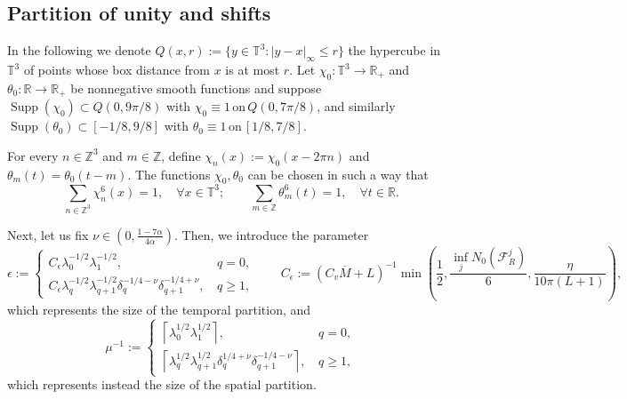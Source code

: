 \documentclass[10pt,a4paper]{amsart}
\numberwithin{equation}{section}
\numberwithin{corollario}{section}
\numberwithin{lemma}{section}
\numberwithin{prop}{section}
\theoremstyle{definition}
\theoremstyle{remark}
\newcommand{\Z}{\mathbb{Z}}
\newcommand{\R}{\mathbb{R}}
\newcommand{\T}{\mathbb{T}}
\newcommand{\F}{\mathcal{F}}
\DeclareMathOperator{\supp}{Supp}
\newcommand{\qq}{_{q+1}}
\newcommand{\oM}{\overline{M}}
\begin{document}
\subsection{Partition of unity and shifts}
In the following we denote $Q(x,r) := \{ y \in \T^3 : |y-x|_{\infty} \leq r \}$ the hypercube in $\T^3$ of points whose box distance from $x$ is at most $r$. 
Let $\chi_0 : \T^3 \to \R_+$ and $\theta_0 : \R \to \R_+$ be nonnegative smooth functions and suppose $\supp(\chi_0) \subset Q\left(0,9\pi/8\right)$ with $\chi_0 \equiv 1 \, \mbox{on}\,Q\left(0,7\pi/8\right)$, and similarly $\supp (\theta_0) \subset [-1/8,9/8]$ with $\theta_0 \equiv 1 \, \mbox{on}\, [1/8,7/8]$.
 
For every $n \in \Z^3$ and $m \in \Z$, define $\chi_n(x) := \chi_0(x-2\pi n)$ and $\theta_m(t)=\theta_0(t-m)$.
The functions $\chi_0,\theta_0$ can be chosen in such a way that 
\[\sum_{n\in \Z^3}\chi_n^6(x)=1,
\quad\forall x\in \T^3;
\qquad \sum_{m\in \Z}\theta_m^6(t)=1, \quad\forall t \in \R.\]

Next, let us fix $\nu \in (0,\frac{1-7\alpha}{4\alpha})$. Then, we introduce the parameter
\begin{equation}
\label{eq:definition_eps}
\epsilon:=\begin{cases}
  C_{\epsilon}  \lambda_0^{-1/2}\lambda_1^{-1/2},\,
  &q=0,
  \\
C_{\epsilon}\lambda_q^{-1/2}\lambda\qq^{-1/2} \delta_q^{-1/4-\nu}\delta\qq^{-1/4+\nu},\,
&q\geq 1,
\end{cases}
\qquad 
C_{\epsilon}:=(C_v \oM+L)^{-1}\min\left(\frac{1}{2},\frac{\inf_{j} N_0(\F_R^j)}6,\frac{\eta}{10\pi (L+1)}\right),
\end{equation}
which represents the size of the temporal partition, and
\begin{equation} \label{eq:definition_mu}
\mu^{-1}:=\begin{cases}\left\lceil\lambda_0^{1/2}\lambda_1^{1/2}\right\rceil,\,&q=0,\\
\left\lceil \lambda_q^{1/2}\lambda\qq^{1/2} \delta_q^{1/4+\nu}\delta\qq^{-1/4-\nu}\right\rceil,\,&q\geq 1,
\end{cases}
\end{equation}
which represents instead the size of the spatial partition.
\end{document}
